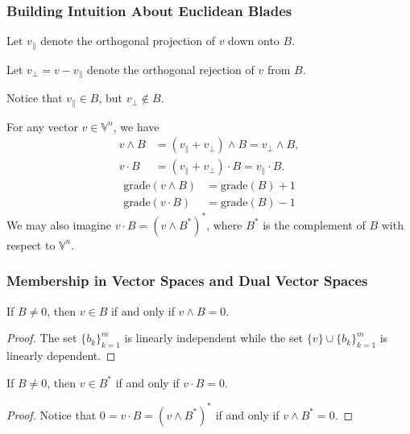 \documentclass{beamer}
\newcommand{\V}{\mathbb{V}}
\newcommand{\grade}{\mbox{grade}}
\begin{document}
\begin{frame}
\frametitle{Building Intuition About Euclidean Blades}
\pause
Let $v_{\parallel}$ denote the orthogonal \alert{projection} of $v$ down onto $B$.\pause

Let $v_{\perp}=v-v_{\parallel}$ denote the orthogonal \alert{rejection} of $v$ from $B$.\pause

Notice that $v_{\parallel}\in B$, but $v_{\perp}\not\in B$.\pause

For any vector $v\in\V^n$, we have
\begin{align*}
v\wedge B &= (v_{\parallel} + v_{\perp})\wedge B = v_{\perp}\wedge B, \\
v\cdot B &= (v_{\parallel} + v_{\perp})\cdot B = v_{\parallel}\cdot B.
\end{align*}\pause
\begin{align*}
\grade(v\wedge B) &= \grade(B) + 1 \\
\grade(v\cdot B) &= \grade(B) - 1
\end{align*}\pause
We may also imagine $v\cdot B=(v\wedge B^*)^*$, where $B^*$ is the \alert{complement}
of $B$ with respect to $\V^n$.
\end{frame}

\begin{frame}
\frametitle{Membership in Vector Spaces and Dual Vector Spaces}
\pause
If $B\neq 0$, then $v\in B$ if and only if $v\wedge B=0$.\pause
\begin{proof}
The set $\{b_k\}_{k=1}^m$ is linearly independent while the set $\{v\}\cup\{b_k\}_{k=1}^m$ is linearly dependent.
\end{proof}\pause
If $B\neq 0$, then $v\in B^*$ if and only if $v\cdot B=0$.\pause
\begin{proof}
Notice that $0=v\cdot B=(v\wedge B^*)^*$ if and only if $v\wedge B^*=0$.
\end{proof}
\end{frame}
\end{document}

